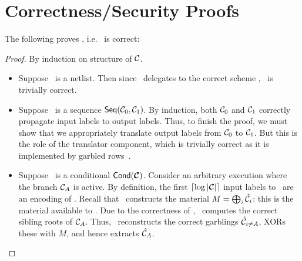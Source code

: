 \section{Correctness/Security Proofs}\label{supp:proofs}

The following proves , i.e. \ourschemelong\
is correct:
\begin{proof}
  By induction on structure of $\mathcal C$.
  \begin{itemize}
    \item Suppose \cir\ is a netlist. Then since \ourschemelong\ delegates
      to the correct scheme \underscheme, \ourschemelong\ is trivially
      correct.
    \item Suppose \cir\ is a sequence $\textsf{Seq}(\mathcal C_0, \mathcal C_1)$.
      By induction, both $\mathcal C_0$ and $\mathcal C_1$ correctly propagate
      input labels to output labels.
      Thus, to finish the proof, we must show that we appropriately
      translate output labels from $\mathcal C_0$ to $\mathcal C_1$. But this is
      the role of the translator component, which is trivially correct
      as it is implemented by garbled rows~\HK.
    \item Suppose \cir\ is a conditional $\conditional(\vec \cir)$.
      Consider an arbitrary execution where the branch $\mathcal C_{A}$ is
      active.
      By definition, the first $\lceil \log |\vec \cir| \rceil$ input
      labels to \gEv\ are an encoding of \act.
      Recall that \gGb\ constructs the material $M = \bigoplus_i
      \hat{\mathcal C}_i$: this is the material available to \gEv.
      Due to the correctness of \gadget, \gEv\ computes the correct
      sibling roots of $\mathcal C_A$. Thus, \evcond\ reconstructs the correct
      garblings $\hat{\mathcal C}_{i \neq A}$, XORs these with $M$, and hence
      extracts $\hat{\mathcal C}_A$.


\end{itemize}
\end{proof}
